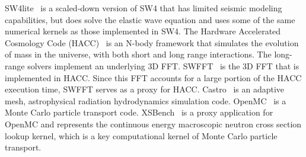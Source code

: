 SW4lite~\cite{ECPProxySuite1} is a scaled-down version of SW4 that has limited seismic modeling capabilities, but does solve the elastic wave equation and uses some of the same numerical kernels as those implemented in SW4. 
%
The Hardware Accelerated Cosmology Code (HACC)~\cite{HACC} is an 
N-body framework that simulates the evolution of mass in the universe, with both short and long range interactions. The long-range solvers implement an underlying 3D FFT. 
SWFFT~\cite{ECPProxySuite1} is the 3D FFT that is implemented in HACC.  Since this FFT accounts for a large portion of the HACC execution time, SWFFT serves as a proxy for HACC.  
%
Castro~\cite{Castro} is an adaptive mesh, astrophysical radiation
hydrodynamics simulation code.  
%
OpenMC~\cite{OpenMC} is a Monte Carlo particle transport code.  
%
XSBench~\cite{XSBench} is a proxy application for OpenMC and represents the
continuous energy macroscopic neutron cross section lookup kernel, which is
a key computational kernel of Monte Carlo particle transport. 

